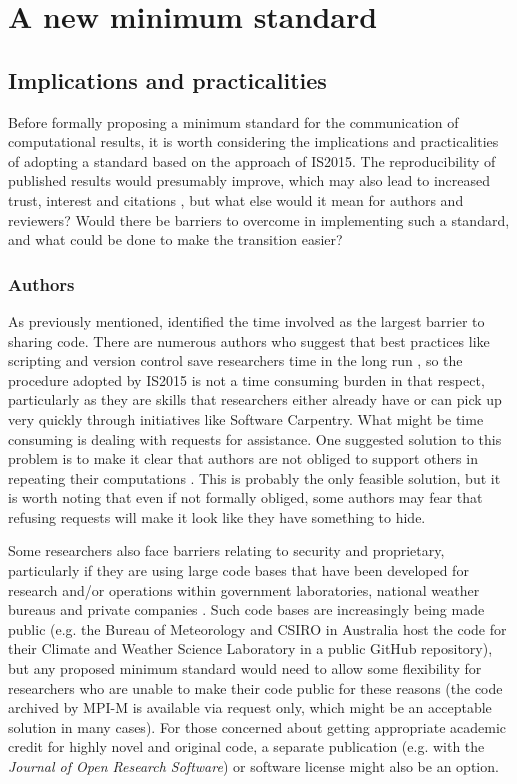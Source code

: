 \section{A new minimum standard}

\subsection{Implications and practicalities}

Before formally proposing a minimum standard for the communication of computational results, it is worth considering the implications and practicalities of adopting a standard based on the approach of IS2015. The reproducibility of published results would presumably improve, which may also lead to increased trust, interest and citations \citep{Piwowar2007}, but what else would it mean for authors and reviewers? Would there be barriers to overcome in implementing such a standard, and what could be done to make the transition easier?

\subsubsection{Authors}

As previously mentioned, \citet{Stodden2010} identified the time involved as the largest barrier to sharing code. There are numerous authors who suggest that best practices like scripting and version control save researchers time in the long run \citep[e.g.][]{Sandve2013,Wilson2014a}, so the procedure adopted by IS2015 is not a time consuming burden in that respect, particularly as they are skills that researchers either already have or can pick up very quickly through initiatives like Software Carpentry. What might be time consuming is dealing with requests for assistance. One suggested solution to this problem is to make it clear that authors are not obliged to support others in repeating their computations \citep{Easterbrook2014}. This is probably the only feasible solution, but it is worth noting that even if not formally obliged, some authors may fear that refusing requests will make it look like they have something to hide. 

Some researchers also face barriers relating to security and proprietary, particularly if they are using large code bases that have been developed for research and/or operations within government laboratories, national weather bureaus and private companies \citep{Stodden2010}. Such code bases are increasingly being made public (e.g. the Bureau of Meteorology and CSIRO in Australia host the code for their Climate and Weather Science Laboratory in a public GitHub repository), but any proposed minimum standard would need to allow some flexibility for researchers who are unable to make their code public for these reasons (the code archived by MPI-M is available via request only, which might be an acceptable solution in many cases). For those concerned about getting appropriate academic credit for highly novel and original code, a separate publication (e.g. with the \textit{Journal of Open Research Software}) or software license \citep[e.g.][]{Stodden2009} might also be an option.

